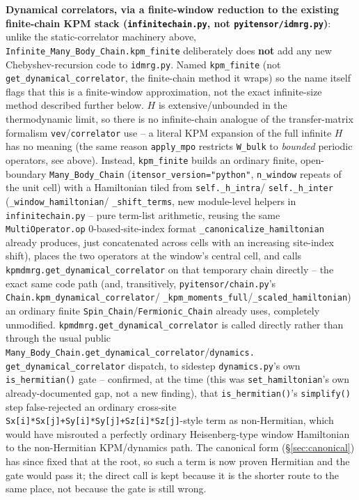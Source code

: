 \documentclass[11pt]{article}
\begin{document}
\textbf{Dynamical correlators, via a finite-window reduction to the
existing finite-chain KPM stack (\texttt{infinitechain.py}, not
\texttt{pyitensor/idmrg.py})}: unlike the static-correlator machinery
above, \texttt{Infinite\_Many\_Body\_Chain.kpm\_finite} deliberately
does \textbf{not} add any new Chebyshev-recursion code to
\texttt{idmrg.py}. Named \texttt{kpm\_finite} (not
\texttt{get\_dynamical\_correlator}, the finite-chain method it wraps)
so the name itself flags that this is a finite-window approximation,
not the exact infinite-size method described further below. $H$ is
extensive/unbounded in the thermodynamic limit, so there is no
infinite-chain analogue of the transfer-matrix formalism
\texttt{vev}/\texttt{correlator} use -- a literal KPM expansion of the
full infinite $H$ has no meaning (the same reason \texttt{apply\_mpo}
restricts \texttt{W\_bulk} to \emph{bounded} periodic operators, see
above). Instead, \texttt{kpm\_finite} builds an ordinary finite,
open-boundary \texttt{Many\_Body\_Chain}
(\texttt{itensor\_version="python"}, \texttt{n\_window} repeats of the
unit cell) with a Hamiltonian tiled from \texttt{self.\_h\_intra}/
\texttt{self.\_h\_inter} (\texttt{\_window\_hamiltonian}/
\texttt{\_shift\_terms}, new module-level helpers in
\texttt{infinitechain.py} -- pure term-list arithmetic, reusing the
same \texttt{MultiOperator.op} 0-based-site-index format
\texttt{\_canonicalize\_hamiltonian} already produces, just
concatenated across cells with an increasing site-index shift), places
the two operators at the window's central cell, and calls
\texttt{kpmdmrg.get\_dynamical\_correlator} on that temporary chain
directly -- the exact same code path (and, transitively,
\texttt{pyitensor/chain.py}'s \texttt{Chain.kpm\_dynamical\_correlator}/
\texttt{\_kpm\_moments\_full}/\texttt{\_scaled\_hamiltonian}) an
ordinary finite \texttt{Spin\_Chain}/\texttt{Fermionic\_Chain} already
uses, completely unmodified. \texttt{kpmdmrg.get\_dynamical\_correlator}
is called directly rather than through the usual public
\texttt{Many\_Body\_Chain.get\_dynamical\_correlator}/\texttt{dynamics.
get\_dynamical\_correlator} dispatch, to sidestep \texttt{dynamics.py}'s
own \texttt{is\_hermitian()} gate -- confirmed, at the time (this was
\texttt{set\_hamiltonian}'s own already-documented gap, not a new
finding), that \texttt{is\_hermitian()}'s \texttt{simplify()} step
false-rejected an ordinary cross-site
\texttt{Sx[i]*Sx[j]+Sy[i]*Sy[j]+Sz[i]*Sz[j]}-style term as
non-Hermitian, which would have misrouted a perfectly ordinary
Heisenberg-type window Hamiltonian to the non-Hermitian KPM/dynamics
path. The canonical form (\S\ref{sec:canonical}) has since fixed that at
the root, so such a term is now proven Hermitian and the gate would pass
it; the direct call is kept because it is the shorter route to the same
place, not because the gate is still wrong.
\end{document}
